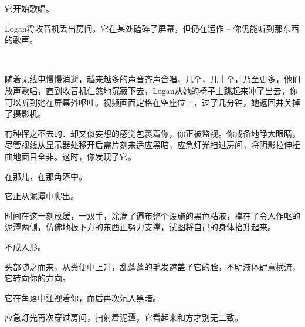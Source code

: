 \begin{scpbox}
它开始歌唱。
\end{scpbox}

\begin{scpdialog}

\end{scpdialog}

\begin{scpdialog}
Logan将收音机丢出房间，它在某处磕碎了屏幕，但仍在运作 – 你仍能听到那东西的歌声。
\end{scpdialog}

\begin{scpdialog}
\\
\end{scpdialog}

\begin{scpbox}
随着无线电慢慢消逝，越来越多的声音齐声合唱，几个，几十个，乃至更多，他们放声歌唱，直到收音机仁慈地沉寂下去，Logan从她的椅子上跳起来冲了出去，你可以听到她在屏幕外呕吐。视频画面定格在空座位上，过了几分钟，她返回并关掉了摄影机。
\end{scpbox}

\hr


\begin{scpbox}

有种挥之不去的、却又似妄想的感觉包裹着你，你正被监视。你戒备地睁大眼睛，尽管视线从显示器处移开后需片刻来适应黑暗，应急灯光扫过房间，将阴影拉伸扭曲地面目全非。这时，你发现了它。

在那儿，在那角落中。

它正从泥潭中爬出。

时间在这一刻放缓，一双手，涂满了遍布整个设施的黑色粘液，撑在了令人作呕的泥潭两侧，仿佛地板下方的东西正努力支撑，试图将自己的身体抬升起来。

不成人形。

头部随之而来，从粪便中上升，乱蓬蓬的毛发遮盖了它的脸，不明液体肆意横流，它转向你的方向。

它在角落中注视着你，而后再次沉入黑暗。

应急灯光再次穿过房间，扫射着泥潭，它看起来和方才别无二致。

\end{scpbox}



